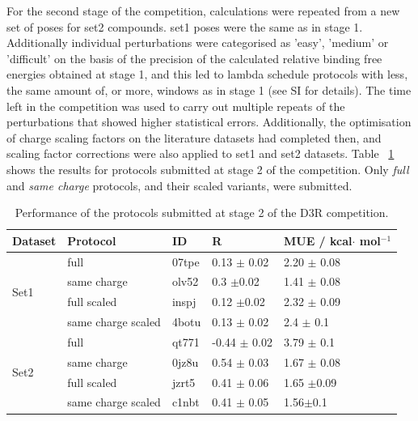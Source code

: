 \documentclass{svjour3}                     %
\begin{document}
For the second stage of the competition, calculations were repeated from a new set of poses for set2 compounds. set1 poses were the same as in stage 1. Additionally individual perturbations were categorised as 'easy', 'medium' or 'difficult' on the basis of the precision of the calculated relative binding free energies obtained at stage 1, and this led to lambda schedule protocols with less, the same amount of, or more, windows as in stage 1 (see SI for details). The time left in the competition was used to carry out multiple repeats of the perturbations that showed higher statistical errors. Additionally, the optimisation of charge scaling factors on the literature datasets had completed then, and scaling factor corrections were also applied to set1 and set2 datasets. 
 Table ~\ref{tab:stage2} shows the results for protocols submitted at stage 2 of the competition. Only \textit{full} and \textit{same charge} protocols, and their scaled variants, were submitted.

\begin{table}[]
\centering
\begin{tabular}{|l|l|l|l|l|}
\hline
Dataset            & Protocol & ID & R & MUE / kcal$\cdot$ mol$^{-1}$ \\ \hline
\multirow{4}{*}{Set1} & full         &        07tpe       & 0.13 $\pm$ 0.02 & 2.20 $\pm$ 0.08   \\ \cline{2-5} 
                   & same charge        & olv52              & 0.3 $\pm$0.02 & 1.41 $\pm$ 0.08   \\ \cline{2-5} 
                   & full scaled        & inspj              & 0.12 $\pm$0.02 & 2.32 $\pm$ 0.09   \\ \cline{2-5} 
                   & same charge scaled        & 4botu              & 0.13 $\pm$ 0.02 & 2.4 $\pm$ 0.1   \\ \hline
\multirow{4}{*}{Set2} & full         & qt771              & -0.44 $\pm$ 0.02 & 3.79 $\pm$ 0.1   \\ \cline{2-5} 
                   & same charge        & 0jz8u              & 0.54 $\pm$ 0.03 & 1.67 $\pm$ 0.08   \\ \cline{2-5} 
                   & full scaled        & jzrt5              & 0.41 $\pm$ 0.06 & 1.65 $\pm$0.09  \\ \cline{2-5} 
                   & same charge scaled       & c1nbt              & 0.41 $\pm$ 0.05 & 1.56$\pm$0.1   \\ \hline
\end{tabular}
\caption{Performance of the protocols submitted at stage 2 of the D3R competition.}
\label{tab:stage2}
\end{table}
\end{document}
